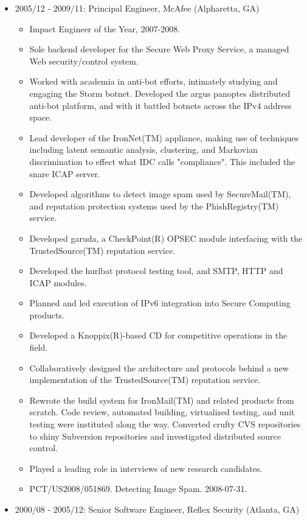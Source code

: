 \documentclass{article}
\newenvironment{tightitemize}
{\begin{itemize}
  \setlength{\itemsep}{1pt}
  \setlength{\parskip}{0pt}
  \setlength{\parsep}{0pt}}
{\end{itemize}}
\begin{document}
\begin{tightitemize}
\item 2005/12 - 2009/11: Principal Engineer, McAfee (Alpharetta, GA)

\begin{tightitemize}
\item Impact Engineer of the Year, 2007-2008.
\item Sole backend developer for the Secure Web Proxy Service, a managed Web
  security/control system.
\item Worked with academia in anti-bot efforts, intimately studying and engaging
  the Storm botnet. Developed the argus panoptes distributed anti-bot
  platform, and with it battled botnets across the IPv4 address space.
\item Lead developer of the IronNet(TM) appliance, making use of techniques
  including latent semantic analysis, clustering, and Markovian discrimination
  to effect what IDC calls "compliance". This included the snare ICAP server.
\item Developed algorithms to detect image spam used by SecureMail(TM), and
  reputation protection systems used by the PhishRegistry(TM) service.
\item Developed garuda, a CheckPoint(R) OPSEC module interfacing with the
  TrustedSource(TM) reputation service.
\item Developed the hurlbat protocol testing tool, and SMTP, HTTP and ICAP modules.
\item Planned and led execution of IPv6 integration into Secure Computing products.
\item Developed a Knoppix(R)-based CD for competitive operations in the field.
\item Collaboratively designed the architecture and protocols behind a new
  implementation of the TrustedSource(TM) reputation service.
\item Rewrote the build system for IronMail(TM) and related products from scratch.
  Code review, automated building, virtualized testing, and unit testing were
  instituted along the way. Converted crufty CVS repositories to shiny
  Subversion repositories and investigated distributed source control.
\item Played a leading role in interviews of new research candidates.
\item PCT/US2008/051869. Detecting Image Spam. 2008-07-31.
\end{tightitemize}

\item 2000/08 - 2005/12: Senior Software Engineer, Reflex Security (Atlanta, GA)


\end{tightitemize}
\end{document}
